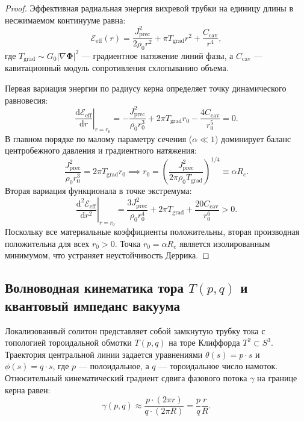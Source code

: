 \documentclass[11pt,a4paper]{article}
\theoremstyle{definition}
\theoremstyle{remark}
\begin{document}
\begin{proof}
Эффективная радиальная энергия вихревой трубки на единицу длины в несжимаемом континууме равна:
\begin{equation}
    \mathcal{E}_{\mathrm{eff}}(r) = \frac{J_{\mathrm{prec}}^2}{2 \rho_0 r^2} + \pi T_{\mathrm{grad}} r^2 + \frac{C_{\mathrm{cav}}}{r^4},
\end{equation}
где $T_{\mathrm{grad}} \sim G_0 |\nabla \boldsymbol{\Phi}|^2$ --- градиентное натяжение линий фазы, а $C_{\mathrm{cav}}$ --- кавитационный модуль сопротивления схлопыванию объема.

Первая вариация энергии по радиусу керна определяет точку динамического равновесия:
\begin{equation}
    \left. \frac{\mathrm{d}\mathcal{E}_{\mathrm{eff}}}{\mathrm{d}r} \right|_{r=r_0} = -\frac{J_{\mathrm{prec}}^2}{\rho_0 r_0^3} + 2\pi T_{\mathrm{grad}} r_0 - \frac{4 C_{\mathrm{cav}}}{r_0^5} = 0.
\end{equation}
В главном порядке по малому параметру сечения ($\alpha \ll 1$) доминирует баланс центробежного давления и градиентного натяжения:
\begin{equation}
    \frac{J_{\mathrm{prec}}^2}{\rho_0 r_0^3} = 2\pi T_{\mathrm{grad}} r_0 \implies r_0 = \left( \frac{J_{\mathrm{prec}}^2}{2\pi \rho_0 T_{\mathrm{grad}}} \right)^{1/4} \equiv \alpha R_e.
\end{equation}
Вторая вариация функционала в точке экстремума:
\begin{equation}
    \left. \frac{\mathrm{d}^2\mathcal{E}_{\mathrm{eff}}}{\mathrm{d}r^2} \right|_{r=r_0} = \frac{3 J_{\mathrm{prec}}^2}{\rho_0 r_0^4} + 2\pi T_{\mathrm{grad}} + \frac{20 C_{\mathrm{cav}}}{r_0^6} > 0.
\end{equation}
Поскольку все материальные коэффициенты положительны, вторая производная положительна для всех $r_0 > 0$. Точка $r_0 = \alpha R_e$ является изолированным минимумом, что устраняет неустойчивость Деррика.
\end{proof}

\subsection{Волноводная кинематика тора $T(p,q)$ и квантовый импеданс вакуума}
Локализованный солитон представляет собой замкнутую трубку тока с топологией тороидальной обмотки $T(p,q)$ на торе Клиффорда $T^2 \subset S^3$. Траектория центральной линии задается уравнениями $\theta(s) = p \cdot s$ и $\phi(s) = q \cdot s$, где $p$ --- полоидальное, а $q$ --- тороидальное число намоток. Относительный кинематический градиент сдвига фазового потока $\gamma$ на границе керна равен:
\begin{equation}
    \gamma(p,q) \approx \frac{p \cdot (2\pi r)}{q \cdot (2\pi R)} = \frac{p}{q} \frac{r}{R}.
\end{equation}
\end{document}
